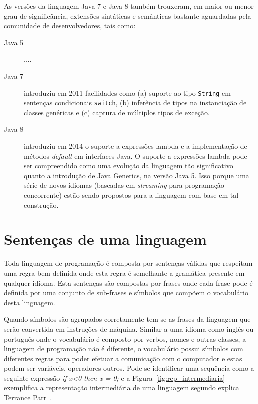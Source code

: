 As versões da linguagem Java 7 e Java 8 também trouxeram, 
em maior ou menor grau de significância, extensões sintáticas 
e semânticas bastante aguardadas pela comunidade de 
desenvolvedores, tais como:

\begin{description}
\item[Java 5] ....

\item[Java 7] introduziu em 2011 facilidades como (a) suporte ao tipo \texttt{String} 
em sentenças condicionais \texttt{switch}, (b) inferência de tipos 
na instanciação de classes genéricas e (c) captura de 
múltiplos tipos de exceção. 

\item[Java 8] introduziu em 2014 o suporte a expressões lambda e a implementação de 
métodos \emph{default} em interfaces Java. O suporte a expressões lambda pode 
ser compreendido como uma evolução da linguagem tão significativo 
quanto a introdução de Java Generics, na versão Java 5. Isso porque 
uma série de novos idiomas (baseadas em \emph{streaming} para programação 
concorrente) estão sendo propostos para a linguagem com base em tal construção.   
\end{description} 


\section{Sentenças de uma linguagem}
Toda linguagem de programação é composta por sentenças válidas que respeitam uma regra bem definida onde esta regra é semelhante a gramática presente em qualquer idioma.  Esta sentenças são compostas por frases onde cada frase pode é definida por uma conjunto de sub-frases e símbolos que compõem o vocabulário desta linguagem. 

Quando símbolos são agrupados corretamente tem-se as frases da linguagem que serão convertida em instruções de máquina. Similar a uma idioma como inglês ou português onde o vocabulário é composto por verbos, nomes e outras classes, a linguagem de programação não é diferente, o vocabulário possui símbolos com diferentes regras para poder efetuar a comunicação com o computador e estas podem ser variáveis, operadores outros. Pode-se identificar uma sequência como a seguinte expressão \textit{if x<0 then x = 0;} e a Figura~\ref{fig:rep_intermediaria} exemplifica a representação intermediária de uma linguagem segundo explica Terrance Parr~\cite{Parr:2009:LIP:1823613}.


